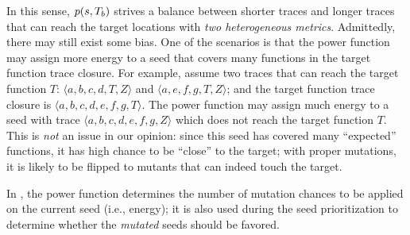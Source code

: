 In this sense, $p(s, T_b)$ strives a balance between shorter traces and longer traces that can reach the target locations with \emph{two heterogeneous metrics}. Admittedly, there may still exist some bias. One of the scenarios is that the power function may assign more energy to a seed that covers many functions in the target function trace closure. For example, assume two traces that can reach the target function $T$: $\langle a,b,c,d,T,Z\rangle$ and $\langle a,e,f,g,T,Z\rangle$; and the target function trace closure is $\langle a, b, c,d,e,f,g,T\rangle$. The power function may assign much energy to a seed with trace $\langle a, b, c, d, e, f, g, Z\rangle$ which does not reach the target function $T$. This is \emph{not} an issue in our opinion: since this seed has covered many ``expected'' functions, it has high chance to be ``close'' to the target; with proper mutations, it is likely to be flipped to mutants that can indeed touch the target.

In {\dFOT}, the power function determines the number of mutation chances to be applied on the current seed (i.e., energy); it is also used during the seed prioritization to determine whether the \emph{mutated} seeds should be favored.


